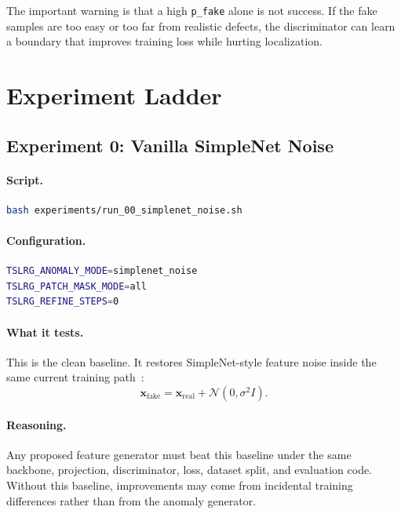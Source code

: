 \documentclass[11pt]{article}
\newcommand{\code}[1]{\texttt{#1}}
\begin{document}
\noindent
The important warning is that a high \code{p\_fake} alone is not success. If the
fake samples are too easy or too far from realistic defects, the discriminator
can learn a boundary that improves training loss while hurting localization.

\section{Experiment Ladder}

\subsection{Experiment 0: Vanilla SimpleNet Noise}

\paragraph{Script.}
\begin{lstlisting}[language=bash]
bash experiments/run_00_simplenet_noise.sh
\end{lstlisting}

\paragraph{Configuration.}
\begin{lstlisting}[language=bash]
TSLRG_ANOMALY_MODE=simplenet_noise
TSLRG_PATCH_MASK_MODE=all
TSLRG_REFINE_STEPS=0
\end{lstlisting}

\paragraph{What it tests.}
This is the clean baseline. It restores SimpleNet-style feature noise inside
the same current training path~\cite{simplenet}:
\begin{equation}
  \mathbf{x}_{\mathrm{fake}}
    =
  \mathbf{x}_{\mathrm{real}} + \mathcal{N}(0, \sigma^2 I).
\end{equation}

\paragraph{Reasoning.}
Any proposed feature generator must beat this baseline under the same backbone,
projection, discriminator, loss, dataset split, and evaluation code. Without this
baseline, improvements may come from incidental training differences rather than
from the anomaly generator.
\end{document}
